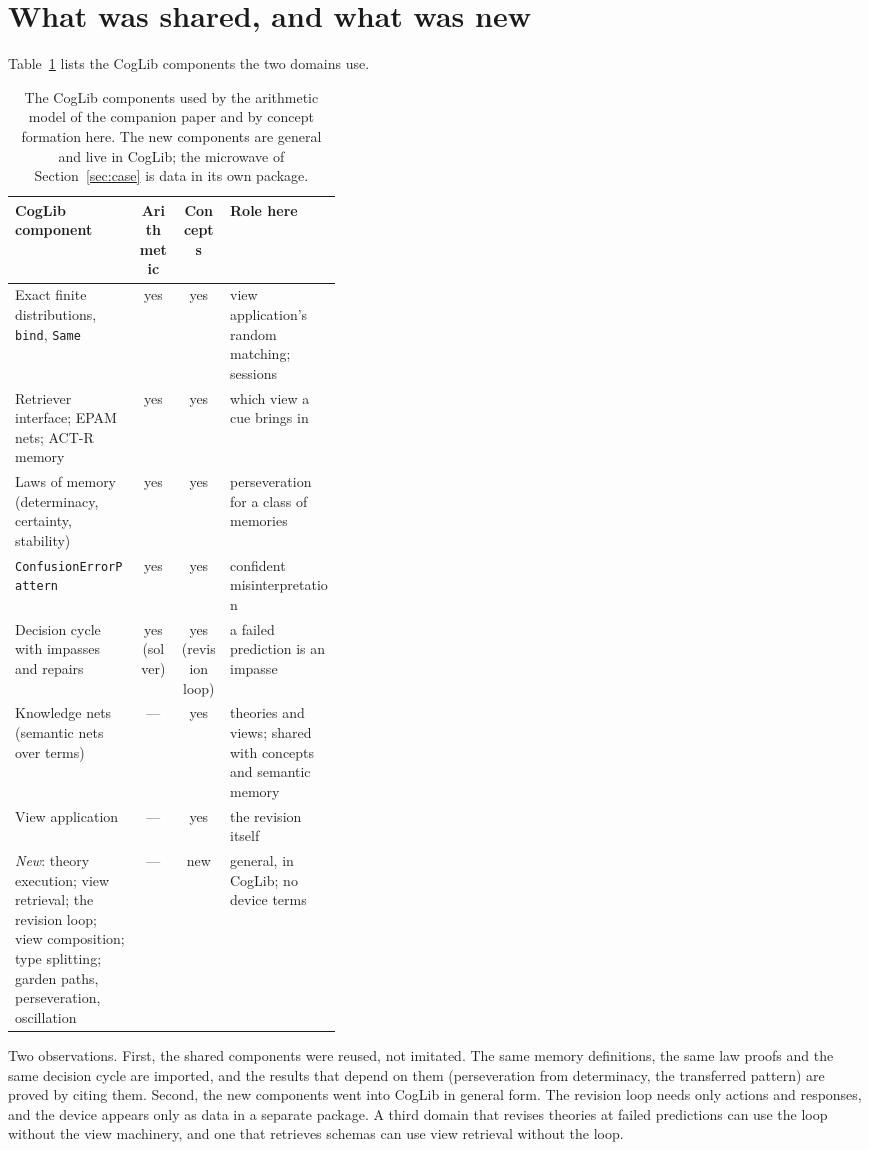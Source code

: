 \documentclass[11pt]{article}
\newcommand{\code}[1]{\texttt{#1}}
\begin{document}
\section{What was shared, and what was new}
\label{sec:shared}

Table~\ref{tab:shared} lists the CogLib components the two domains use.

\begin{table}[t]
\centering
\small
\begin{tabularx}{\linewidth}{@{}>{\raggedright\arraybackslash}p{0.38\linewidth}cc>{\raggedright\arraybackslash}X@{}}
\toprule
CogLib component & Arithmetic & Concepts & Role here \\
\midrule
Exact finite distributions, \code{bind}, \code{Same} & yes & yes & view application's random matching; sessions \\
Retriever interface; EPAM nets; ACT-R memory & yes & yes & which view a cue brings in \\
Laws of memory (determinacy, certainty, stability) & yes & yes & perseveration for a class of memories \\
\code{ConfusionErrorPattern} & yes & yes & confident misinterpretation \\
Decision cycle with impasses and repairs & yes (solver) & yes (revision loop) & a failed prediction is an impasse \\
Knowledge nets (semantic nets over terms) & --- & yes & theories and views; shared with concepts and semantic memory \\
View application & --- & yes & the revision itself \\
\addlinespace
\emph{New}: theory execution; view retrieval; the revision loop; view composition; type splitting; garden paths, perseveration, oscillation & --- & new & general, in CogLib; no device terms \\
\bottomrule
\end{tabularx}
\caption{The CogLib components used by the arithmetic model of the companion paper and by concept formation here. The new components are general and live in CogLib; the microwave of Section~\ref{sec:case} is data in its own package.}
\label{tab:shared}
\end{table}

Two observations. First, the shared components were reused, not imitated. The same memory definitions, the same law proofs and the same decision cycle are imported, and the results that depend on them (perseveration from determinacy, the transferred pattern) are proved by citing them. Second, the new components went into CogLib in general form. The revision loop needs only actions and responses, and the device appears only as data in a separate package. A third domain that revises theories at failed predictions can use the loop without the view machinery, and one that retrieves schemas can use view retrieval without the loop.
\end{document}
